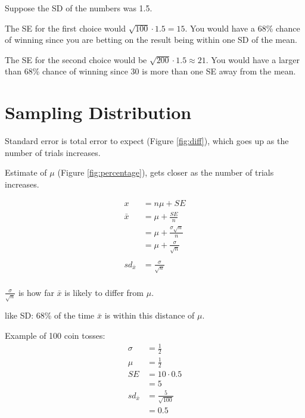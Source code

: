\documentclass[portrait]{exam}
\begin{document}
\begin{enumerate}
\begin{solution}
        Suppose the SD of the numbers was 1.5.
        
        The SE for the first choice would $\sqrt{100} \cdot 1.5 = 15$. You would
        have a 68\% chance of winning since you are betting on the result being
        within one SD of the mean. 
        
        The SE for the second choice would be $\sqrt{200} \cdot 1.5 \approx 21$.
        You would have a larger than 68\% chance of winning since 30 is more
        than one SE away from the mean.

      \end{solution}
  \end{enumerate}

  \section{Sampling Distribution}

  Standard error is total error to expect (Figure \ref{fig:diff}), which goes up
  as the number of trials increases.

  Estimate of $\mu$ (Figure \ref{fig:percentage}), gets closer
  as the number of trials increases.

  \begin{align*}
    x            & = n \mu + SE \\
    \bar{x}      & = \mu + \frac{SE}{n} \\
                 & = \mu + \frac{\sigma \sqrt{n}}{n} \\
                 & = \mu + \frac{\sigma}{\sqrt{n}} \\
    \\
    sd_{\bar{x}} & = \frac{\sigma}{\sqrt{n}} \\
  \end{align*}

  \begin{itemize*}
    \item $\frac{\sigma}{\sqrt{n}}$ is how far $\bar{x}$ is likely to differ
      from $\mu$.
    \item like SD: 68\% of the time $\bar{x}$ is within this distance of
      $\mu$.
  \end{itemize*}

  Example of 100 coin tosses:
  \begin{align*}
    \sigma        & = \frac{1}{2} \\
    \mu           & = \frac{1}{2} \\
    SE            & = 10 \cdot 0.5 \\
                  & = 5 \\
     sd_{\bar{x}} & = \frac{5}{\sqrt{100}} \\
                  & = 0.5 \\
  \end{align*}
\end{document}
